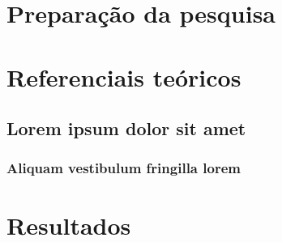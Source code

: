 \documentclass[
	12pt,                     %
	openright,                %
	oneside,                  %
	a4paper,                  %
	english,                  %
	brazil                    %
	]{abntex2}
\begin{document}
\frenchspacing  %

\pretextual
\imprimircapa
\imprimirfolhaderosto*


\tableofcontents*
\cleardoublepage

\textual




\part{Preparação da pesquisa}



\part{Referenciais teóricos}

\chapter{Lorem ipsum dolor sit amet}

\section{Aliquam vestibulum fringilla lorem}

\lipsum[1]

\lipsum[2-3]

\part{Resultados}
\end{document}
